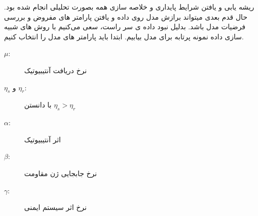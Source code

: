 ریشه یابی و یافتن شرایط پایداری و خلاصه سازی همه بصورت تحلیلی انجام شده بود. 
حال قدم بعدی میتواند برازش مدل روی داده و یافتن پارامتر های مفروض و بررسی فرضیات مدل باشد.
بدلیل نبود داده ی سر راست، سعی می‌کنیم با روش های شبیه سازی داده نمونه پرتابه برای مدل بیابیم. 
ابتدا باید پارامتر های مدل را انتخاب کنیم. 

\begin{description}
    \item[$\mu$:] نرخ دریافت آنتیبیوتیک
    \item[$\eta_s$ و $\eta_r$:] با دانستن $\eta_s >‌ \eta_r$ 
    \item[$\alpha$:] اثر آنتیبیوتیک
    \item[$\beta$:] نرخ جابجایی ژن مقاومت
    \item[$\gamma$:] نرخ اثر سیستم ایمنی
\end{description}
